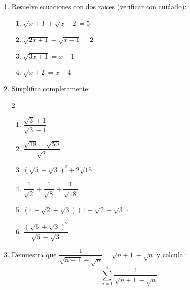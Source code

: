 \documentclass[11pt, letterpaper]{article}
\begin{document}
\begin{enumerate}[label=\textbf{\arabic*.}, leftmargin=*, resume]
  \item Resuelve ecuaciones con dos raíces (verificar con cuidado):
  \begin{enumerate}[label=\alph*)]
    \item $\sqrt{x+3}+\sqrt{x-2}=5$
    \item $\sqrt{2x+1}-\sqrt{x-1}=2$
    \item $\sqrt{3x+1}=x-1$
    \item $\sqrt{x+2}=x-4$
  \end{enumerate}

  \item Simplifica completamente:
  \begin{multicols}{2}
  \begin{enumerate}[label=\alph*)]
    \item $\dfrac{\sqrt{3}+1}{\sqrt{3}-1}$
    \item $\dfrac{\sqrt{18}+\sqrt{50}}{\sqrt{2}}$
    \item $(\sqrt{5}-\sqrt{3})^2+2\sqrt{15}$
    \item $\dfrac{1}{\sqrt{2}}+\dfrac{1}{\sqrt{8}}+\dfrac{1}{\sqrt{18}}$
    \item $(1+\sqrt{2}+\sqrt{3})(1+\sqrt{2}-\sqrt{3})$
    \item $\dfrac{(\sqrt{5}+\sqrt{3})^2}{\sqrt{5}-\sqrt{3}}$
  \end{enumerate}
  \end{multicols}

  \item Demuestra que $\dfrac{1}{\sqrt{n+1}-\sqrt{n}}=\sqrt{n+1}+\sqrt{n}$ y calcula:
  $$\sum_{n=1}^{4}\frac{1}{\sqrt{n+1}-\sqrt{n}}$$
\end{enumerate}
\end{document}
